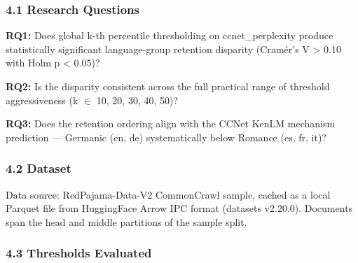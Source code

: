 
\subsubsection{4.1 Research Questions}

\textbf{RQ1:} Does global k-th percentile thresholding on ccnet\_perplexity produce statistically significant language-group retention disparity (Cramér's V > 0.10 with Holm p < 0.05)?

\textbf{RQ2:} Is the disparity consistent across the full practical range of threshold aggressiveness (k $\in$ {10, 20, 30, 40, 50})?

\textbf{RQ3:} Does the retention ordering align with the CCNet KenLM mechanism prediction --- Germanic (en, de) systematically below Romance (es, fr, it)?

\subsubsection{4.2 Dataset}

\begin{table}[htbp]
\centering
{}
\end{table}

Data source: RedPajama-Data-V2 CommonCrawl sample, cached as a local Parquet file from HuggingFace Arrow IPC format (datasets v2.20.0). Documents span the head and middle partitions of the sample split.

\subsubsection{4.3 Thresholds Evaluated}

\begin{table}[htbp]
\centering
{}
\end{table}

